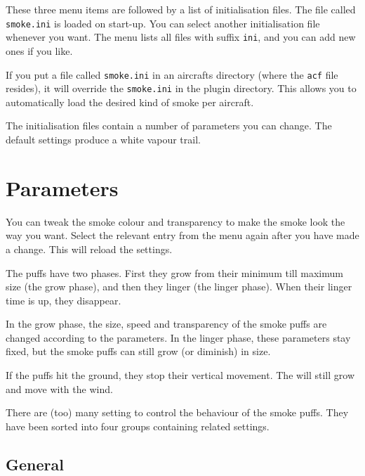 \documentclass[a4paper,12pt]{article}
\begin{document}
These three menu items are followed by a list of initialisation files.
The file called \texttt{smoke.ini} is loaded on start-up. You can
select another initialisation file whenever you want. The menu lists
all files with suffix \texttt{ini}, and you can add new ones if you
like. 

If you put a file called \texttt{smoke.ini} in an aircrafts directory
(where the \texttt{acf} file resides), it will override the
\texttt{smoke.ini} in the plugin directory. This allows you to
automatically load the desired kind of smoke per aircraft.

\vspace{0.5\baselineskip}
The initialisation files contain a number of parameters you can
change. The default settings produce a white vapour trail. 

\vspace{3cm}
\section*{\Huge{\textbf{Parameters}}}
\vspace{1cm}

\vspace{0.5\baselineskip}
You can tweak the smoke colour and transparency to make the smoke look the
way you want. Select the relevant entry from the menu again after you
have made a change. This will reload the settings.

The puffs have two phases. First they grow from their minimum till
maximum size (the grow phase), and then they linger (the linger
phase). When their linger time is up, they disappear. 

In the grow phase, the size, speed and transparency of the smoke puffs
are changed according to the parameters. In the linger phase, these
parameters stay fixed, but the smoke puffs can still grow (or
diminish) in size.

If the puffs hit the ground, they stop their vertical movement. The
will still grow and move with the wind.

There are (too) many setting to control the behaviour of the smoke
puffs. They have been sorted into four groups containing related
settings.

\vspace{0.2cm}
\subsection*{\large{\textbf{General}}}
\vspace{0.2cm}
\end{document}
